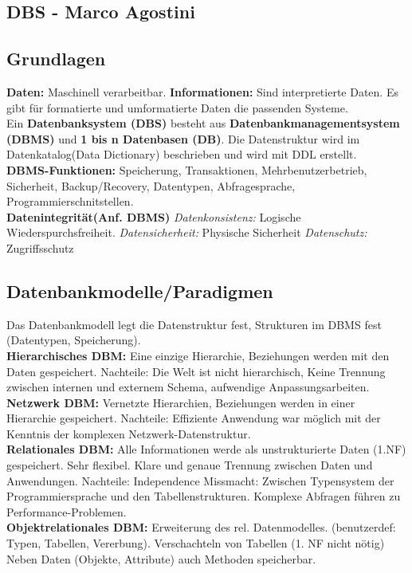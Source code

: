 \documentclass[7pt,landscape,a4paper]{scrartcl}
\begin{document}
\begin{multicols*}{4}

\section{DBS - Marco Agostini}

\subsection{Grundlagen}
\textbf{Daten:} Maschinell verarbeitbar. \textbf{Informationen:} Sind interpretierte Daten.
Es gibt für formatierte und umformatierte Daten die passenden Systeme. \\
Ein \textbf{Datenbanksystem (DBS)} besteht aus \textbf{Datenbankmanagementsystem (DBMS)} und \textbf{1 bis n Datenbasen (DB)}. Die Datenstruktur wird im Datenkatalog(Data Dictionary) beschrieben und wird mit DDL erstellt. \\
\textbf{DBMS-Funktionen:} Speicherung, Transaktionen, Mehrbenutzerbetrieb, Sicherheit, Backup/Recovery, Datentypen, Abfragesprache, Programmierschnitstellen.\\
\textbf{Datenintegrität(Anf. DBMS)} 
\textit{Datenkonsistenz:} Logische Wiederspurchsfreiheit.
\textit{Datensicherheit:} Physische Sicherheit
\textit{Datenschutz:} Zugriffsschutz
\subsection{Datenbankmodelle/Paradigmen}
Das Datenbankmodell legt die Datenstruktur fest, Strukturen im DBMS fest (Datentypen, Speicherung). \\
\textbf{Hierarchisches DBM:} Eine einzige Hierarchie, Beziehungen werden mit den Daten gespeichert. Nachteile: Die Welt ist nicht hierarchisch, Keine Trennung zwischen internen und externem Schema, aufwendige Anpassungsarbeiten.\\
\textbf{Netzwerk DBM: } Vernetzte Hierarchien, Beziehungen werden in einer Hierarchie gespeichert. Nachteile: Effiziente Anwendung war möglich mit der Kenntnis der komplexen Netzwerk-Datenstruktur.\\
\textbf{Relationales DBM:} Alle Informationen werde als unstrukturierte Daten (1.NF) gespeichert. Sehr flexibel. Klare und genaue Trennung zwischen Daten und Anwendungen. Nachteile: Independence Missmacht: Zwischen Typensystem der Programmiersprache und den Tabellenstrukturen. Komplexe Abfragen führen zu Performance-Problemen.\\
\textbf{Objektrelationales DBM:} Erweiterung des rel. Datenmodelles. (benutzerdef: Typen, Tabellen, Vererbung). Verschachteln von Tabellen (1. NF nicht nötig) Neben Daten (Objekte, Attribute) auch Methoden speicherbar.

\end{multicols*}
\end{document}
